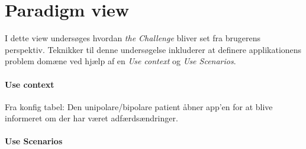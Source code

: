\section{Paradigm view}
I dette view undersøges hvordan \textit{the Challenge} bliver set fra brugerens perspektiv.
Teknikker til denne undersøgelse inkluderer at definere applikationens problem domæne ved hjælp af en \textit{Use context} og \textit{Use Scenarios}.

\paragraph{Use context}

Fra konfig tabel:
Den unipolare/bipolare patient åbner app’en for at blive informeret om der har været adfærdsændringer.

\paragraph{Use Scenarios}